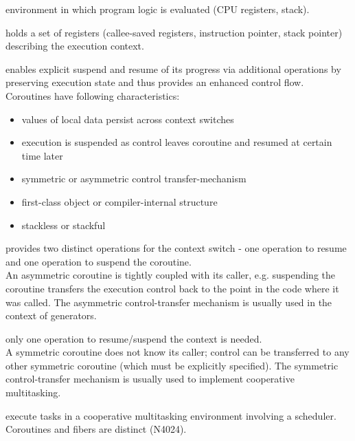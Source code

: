 
environment in which program logic is evaluated (CPU registers, stack).

holds a set of registers (callee-saved registers, instruction pointer, stack
pointer) describing the execution context.

enables explicit suspend and resume of its progress via additional operations by
preserving execution state and thus provides an enhanced control flow.
Coroutines have following characteristics\cite{N3985}:
\begin{itemize}
    \item values of local data persist across context switches
    \item execution is suspended as control leaves coroutine and resumed at
          certain time later
    \item symmetric or asymmetric control transfer-mechanism
    \item first-class object or compiler-internal structure
    \item stackless or stackful
\end{itemize}

provides two distinct operations for the context switch - one operation to
resume and one operation to suspend the coroutine.\\
An asymmetric coroutine is tightly coupled with its caller, e.g. suspending the
coroutine transfers the execution control back to the point in the code where it
was called. The asymmetric control-transfer mechanism is usually used in the
context of generators.

only one operation to resume/suspend the context is needed.\\
A symmetric coroutine does not know its caller; control can
be transferred to any other symmetric coroutine (which must be explicitly specified).
The symmetric control-transfer mechanism is usually used to implement
cooperative multitasking.

execute tasks in a cooperative multitasking environment involving a scheduler.
Coroutines and fibers are distinct (N4024\cite{N4024}).

